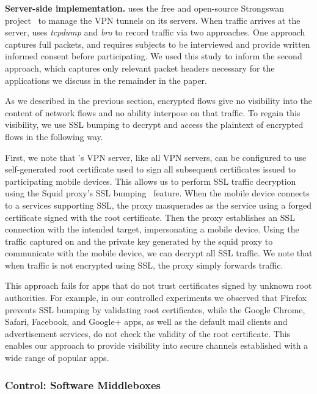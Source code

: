 \noindent\textbf{Server-side implementation.} 
\meddle uses the free and open-source Strongswan project~\cite{strongswan} to manage the VPN tunnels 
on its servers. When traffic arrives at the server, \meddle uses \emph{tcpdump} and \emph{bro} to record 
traffic via two approaches. One approach captures full packets, 
and requires subjects to be interviewed and provide written informed consent before participating. 
We used this study to inform the second approach, which captures only relevant packet headers 
necessary for the applications we discuss in the remainder in the paper. 

As we described in the previous section, encrypted flows give \meddle no visibility into the 
content of network flows and no ability interpose on that traffic. To regain this visibility, we use SSL 
bumping to decrypt and access the plaintext of encrypted flows in the following way. 
 
First, we note that \meddle's VPN server, like all VPN servers, can be configured to use self-generated root certificate used to sign all subsequent certificates issued to participating mobile devices. 
This allows us to perform SSL traffic decryption using the Squid proxy's SSL bumping~\cite{sslbump} feature.
When the mobile device connects to a services supporting SSL, the proxy masquerades as the service using a forged certificate signed with the \meddle root certificate. 
Then the proxy establishes an SSL connection with the intended target, impersonating a mobile device. 
Using the traffic captured on \meddle and the private key generated by the squid proxy to communicate with the mobile device, we can decrypt all SSL traffic. We note that when traffic is not encrypted using SSL, the proxy simply forwards traffic. 

This approach fails for apps that do not trust certificates signed by unknown root authorities. 
For example, in our controlled experiments we observed that Firefox prevents SSL bumping by validating root certificates, while the Google Chrome, Safari, Facebook, and Google+ apps, as well as the default mail clients and advertisement services, do not check the validity of the root certificate. 
This enables our approach to provide visibility into secure channels established with a wide range of popular apps. 


\subsubsection{Control: Software Middleboxes}
\label{subsec:design_control}

